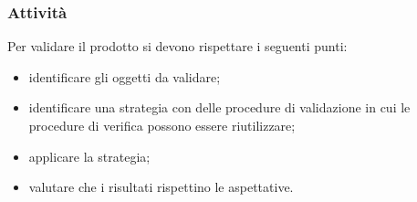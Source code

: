 	\subsubsection{Attività}
	Per validare il prodotto si devono rispettare i seguenti punti:
	\begin{itemize}
		\item identificare gli oggetti da validare;
		\item identificare una strategia con delle procedure di validazione in cui le procedure di verifica possono essere riutilizzare;
		\item applicare la strategia;
		\item valutare che i risultati rispettino le aspettative.
	\end{itemize}
